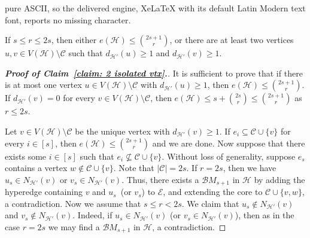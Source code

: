 \documentclass[10pt,a4paper]{amsart}
\newcommand\cB{{\mathcal B}}
\newcommand\cC{{\mathcal C}}
\newcommand\cE{{\mathcal E}}
\newcommand\cH{{\mathcal H}}
\begin{document}
pure ASCII, so the delivered engine, XeLaTeX with its default Latin Modern text font, reports no missing character.
    \begin{cla}\label{claim: 2 isolated vtx}
        If $s\leq r\leq 2s$,
        then either $e(\cH)\leq \binom{2s+1}{r}$,
        or there are at least two vertices $u, v\in V(\cH)\setminus \cC$ such that $d_{\cH'}(u) \geq 1$ and $d_{\cH'}(v) \geq 1$.
    \end{cla}

    \begin{proof}[{\bf{Proof of Claim~\ref{claim: 2 isolated vtx}.}}]
    It is sufficient to prove that if there is at most one vertex $u\in V(\cH)\setminus \cC$ with $d_{\cH'}(u) \geq 1$, then $e(\cH)\leq \binom{2s+1}{r}$.
    If $d_{\cH'}(v)=0$ for every $v\in V(\cH)\setminus \cC$, then $e(\cH) \leq s+\binom{2s}{r}\leq \binom{2s+1}{r}$ as $r\leq 2s$.

    Let $v\in V(\cH)\setminus \cC$ be the unique vertex with $d_{\cH'}(v)\geq 1$. If $e_i \subseteq \cC \cup \{v\}$ for every $i\in [s]$, then $e(\cH) \leq \binom{2s+1}{r}$ and we are done. Now suppose that there exists some $i\in [s]$ such that $e_i \nsubseteq \cC \cup \{v\}$.
    Without loss of generality, suppose $e_s$ contains a vertex $w \notin \cC \cup \{v\}$. Note that $|\cC|=2s$. If $r=2s$, then we have $u_s\in N_{\cH'}(v)$ or $v_s\in N_{\cH'}(v)$. Thus, there exists a $\cB M_{s+1}$ in $\cH$ by adding the hyperedge containing $v$ and $u_s$~(or $v_s$) to $\cE$, and extending the core to $\cC\cup \{v,w\}$, a contradiction. Now we assume that $s\leq r<2s$.
    We claim that $u_s\notin N_{\cH'}(v)$ and $v_s \notin N_{\cH'}(v)$.
    Indeed, if $u_s\in N_{\cH'}(v)$ (or $v_s\in N_{\cH'}(v)$), then as in the case $r=2s$ we may find a $\cB M_{s+1}$ in $\cH$, a contradiction.


\end{proof}
\end{document}
